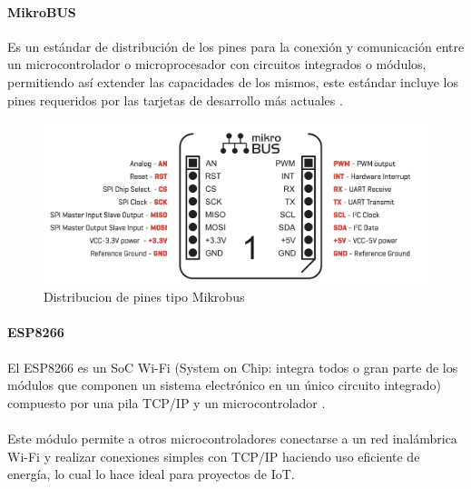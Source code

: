 \paragraph{MikroBUS}
Es un estándar de distribución de los pines para la conexión y comunicación entre un microcontrolador o microprocesador con circuitos integrados o módulos, permitiendo así extender las capacidades de los mismos, este estándar incluye los pines requeridos por las tarjetas de desarrollo más actuales \citep{MarcoTeorico5}.
\begin{figure}[H]
	\centering
	\includegraphics[scale=.25]{Capitulo2/images/mikrobus.png}
	\caption{Distribucion de pines tipo Mikrobus}
	\label{fig:diagrama_dispensador}
\end{figure}
\paragraph{}

\paragraph{ESP8266}
El ESP8266 es un SoC Wi-Fi \citep{MarcoTeorico7} (System on Chip: integra todos o gran parte de los módulos que componen un sistema electrónico en un único circuito integrado) compuesto por una pila TCP/IP y un microcontrolador \citep{MarcoTeorico8}.
\paragraph{}

Este módulo permite a otros microcontroladores conectarse a un red inalámbrica Wi-Fi y realizar conexiones simples con TCP/IP haciendo uso eficiente de energía, lo cual lo hace ideal para proyectos de IoT.

